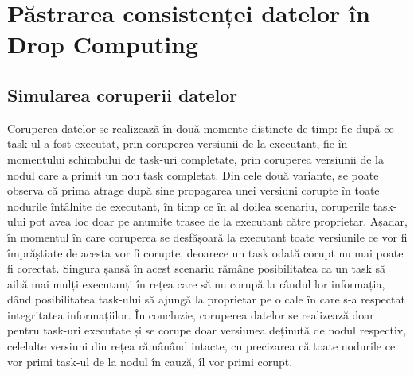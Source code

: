 \documentclass[12pt,a4paper]{report}
\begin{document}

\section{Păstrarea consistenței datelor în Drop Computing} \label{solutieConsistenta}

\subsection{Simularea coruperii datelor}	\label{simulareaCoruperii}

Coruperea datelor se realizează în două momente distincte de timp: fie după ce task-ul a fost executat, prin coruperea versiunii de la executant, fie în momentului schimbului de task-uri completate, prin coruperea versiunii de la nodul care a primit un nou task completat. Din cele două variante, se poate observa că prima atrage după sine propagarea unei versiuni corupte în toate nodurile întâlnite de executant, în timp ce în al doilea scenariu, coruperile task-ului pot avea loc doar pe anumite trasee de la executant către proprietar. Așadar, în momentul în care coruperea se desfășoară la executant toate versiunile ce vor fi împrăștiate de acesta vor fi corupte, deoarece un task odată corupt nu mai poate fi corectat. Singura șansă în acest scenariu rămâne posibilitatea ca un task să aibă mai mulți executanți în rețea care să nu corupă la rândul lor informația, dând posibilitatea task-ului să ajungă la proprietar pe o cale în care s-a respectat integritatea informațiilor. 
În concluzie, coruperea datelor se realizează doar pentru task-uri executate și se corupe doar versiunea deținută de nodul respectiv, celelalte versiuni din rețea rămânând intacte, cu precizarea că toate nodurile ce vor primi task-ul de la nodul în cauză, îl vor primi corupt.
\end{document}
